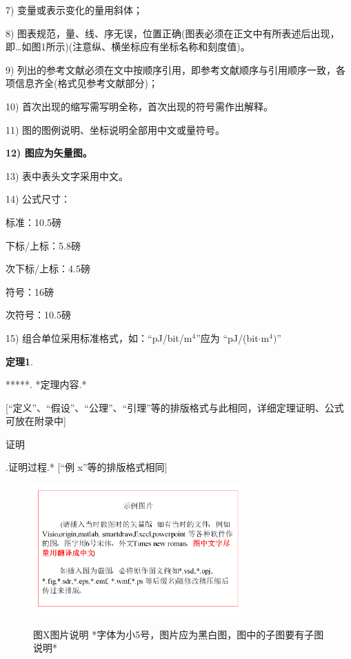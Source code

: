 \documentclass[10.5pt,compsoc]{CjC}
\theoremstyle{mystyle}
\begin{document}
\begin{CJK*}{UTF8}{song}
7) 变量或表示变化的量用斜体；

8) 图表规范，量、线、序无误，位置正确(图表必须在正文中有所表述后出现，即{\ldots}如图1所示)(注意纵、横坐标应有坐标名称和刻度值)。

9) 列出的参考文献必须在文中按顺序引用，即参考文献顺序与引用顺序一致，各项信息齐全(格式见参考文献部分)；

10) 首次出现的缩写需写明全称，首次出现的符号需作出解释。

11) 图的图例说明、坐标说明全部用中文或量符号。

\textbf{12) 图应为矢量图。}

13) 表中表头文字采用中文。

14) 公式尺寸：

标准：10.5磅

下标/上标：5.8磅

次下标/上标：4.5磅

符号：16磅

次符号：10.5磅

15) 组合单位采用标准格式，如：``pJ/bit/m$^{4}$''应为 ``pJ/(bit$\cdot
$m$^{4})$''

{\begin{CJK*}{UTF8}{zhhei}\textbf{定理1}.\end{CJK*}}\quad ******. *定理内容.*

[``定义''、``假设''、``公理''、``引理''等的排版格式与此相同，详细定理证明、公式可放在附录中]

{\begin{CJK*}{UTF8}{song}证明\end{CJK*}}.\quad  *证明过程.* [``例 x''等的排版格式相同]


\begin{figure}[htbp]
\centerline{\includegraphics[width=3.15in,height=1.98in]{CJC1.pdf}}
图X\quad  图片说明 *字体为小5号，图片应为黑白图，图中的子图要有子图说明*
\label{fig1}
\end{figure}


\end{CJK*}
\end{document}
